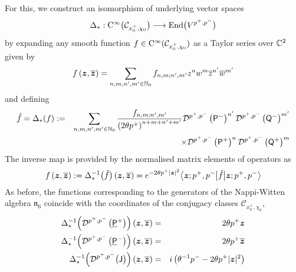 For this, we construct an isomorphism of underlying vector spaces
\begin{equation}
  \label{Deltastar}
  \Delta_* : {\rm C}^\infty\bigl(\mathcal{C}_{x_0^+,\chi_0}\bigr)
  \longrightarrow {\rm End}\bigl(V^{p^+,p^-}\bigr)
\end{equation}
by expanding any smooth function $f\in{\rm C}^\infty
(\mathcal{C}_{x_0^+,\chi_0})$ as a Taylor series over ${\mathbb C}^2$ given by
\begin{equation}
  \label{TaylorD3}
  f\left({{\boldsymbol {z} }},\overline{{{\boldsymbol {z} }}} \right)=\sum_{n,m,n',m'\in{\mathbb N}_0}f_{n,m;n',m'} 
  z^n w^m \overline{z}{}^{ n'} \overline{w}^{ m'}
\end{equation}
and defining
\begin{eqnarray}
  \label{DeltafD3}
  \hat f = \Delta_*(f)&:=&\sum_{n,m,n',m'\in{\mathbb N}_0} \frac{f_{n,m;n',m'}}
  {\left(2\theta p^+\right)^{n+m+n'+m'}} {\mathcal D}^{p^+,p^-}\left({\sf P}^-\right)^{n'} 
  {\mathcal D}^{p^+,p^-}\left({\sf Q}^-\right)^{m'}\nonumber\\ &&\times {\mathcal D}^{p^+,p^-}\left({\sf P}^+\right)^{n} 
  {\mathcal D}^{p^+,p^-}\left({\sf Q}^+\right)^{m}
\end{eqnarray}
The inverse map is provided by the normalised matrix elements of
operators as
\begin{equation}
  \label{DeltainvD3}
  f\left({{\boldsymbol {z} }},\overline{{{\boldsymbol {z} }}} \right):=\Delta_*^{-1}\bigl(\hat f 
  \bigr)\left({{\boldsymbol {z} }},\overline{{{\boldsymbol {z} }}} \right)= e^{-2\theta p^+ |{{\boldsymbol {z} }}|^2} 
  \bigl\langle{{\boldsymbol {z} }};p^+,p^-\bigl| \hat f \bigr|{{\boldsymbol {z} }};p^+,p^-\bigr\rangle
\end{equation}
As before, the functions corresponding to the generators of the
Nappi-Witten algebra $\mathfrak{n}_6$ coincide with the coordinates of
the conjugacy classes $\mathcal{C}_{x_0^+,\chi_0}$,
\begin{eqnarray}
  \label{DeltainvD3gens}
  \Delta_*^{-1}\Bigl({\mathcal D}^{p^+,p^-}\left( \underline{\sf P}{}^+\right)\Bigr)\left({{\boldsymbol {z} }},
    \overline{{{\boldsymbol {z} }}} \right)&=&2\theta p^+ {{\boldsymbol {z} }} \\\nonumber
  \Delta_*^{-1}\Bigl({\mathcal D}^{p^+,p^-}\left( \underline{\sf P}{}^-\right)\Bigr)\left({{\boldsymbol {z} }},
    \overline{{{\boldsymbol {z} }}} \right)&=&2\theta p^+ \overline{{{\boldsymbol {z} }}} \\\nonumber
  \Delta_*^{-1}\Bigl({\mathcal D}^{p^+,p^-}\bigl({\sf J} \bigr)\Bigr)\left({{\boldsymbol {z} }},
    \overline{{{\boldsymbol {z} }}} \right)&=&
  i\left(\theta^{-1} p^--2\theta p^+ |{{\boldsymbol {z} }}|^2\right)
\end{eqnarray}

